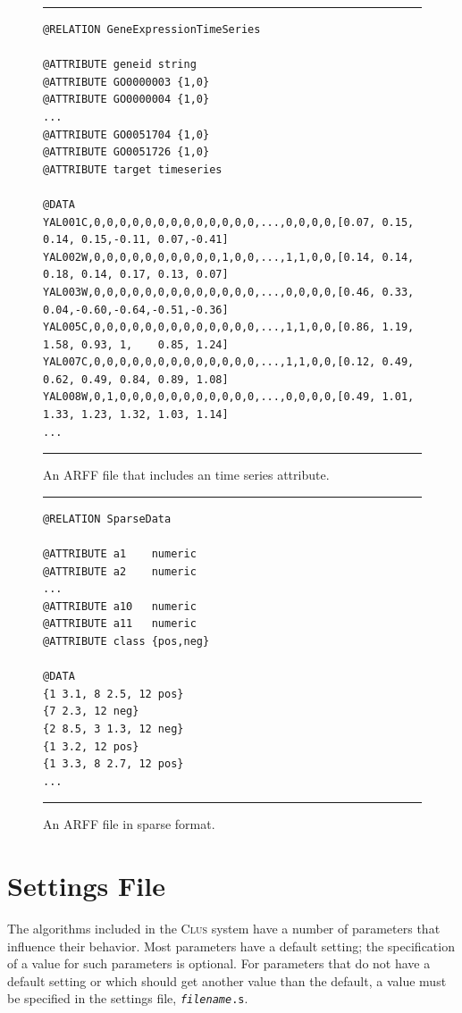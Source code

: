 \documentclass[a4paper]{report}
\newcommand{\clus}{\textsc{Clus}}
\begin{document}
\begin{figure}[tb]
\hrule\vspace{1em}
\begin{verbatim}
@RELATION GeneExpressionTimeSeries

@ATTRIBUTE geneid string
@ATTRIBUTE GO0000003 {1,0}
@ATTRIBUTE GO0000004 {1,0}
...
@ATTRIBUTE GO0051704 {1,0}
@ATTRIBUTE GO0051726 {1,0}
@ATTRIBUTE target timeseries

@DATA
YAL001C,0,0,0,0,0,0,0,0,0,0,0,0,0,...,0,0,0,0,[0.07, 0.15, 0.14, 0.15,-0.11, 0.07,-0.41]
YAL002W,0,0,0,0,0,0,0,0,0,0,1,0,0,...,1,1,0,0,[0.14, 0.14, 0.18, 0.14, 0.17, 0.13, 0.07]
YAL003W,0,0,0,0,0,0,0,0,0,0,0,0,0,...,0,0,0,0,[0.46, 0.33, 0.04,-0.60,-0.64,-0.51,-0.36]
YAL005C,0,0,0,0,0,0,0,0,0,0,0,0,0,...,1,1,0,0,[0.86, 1.19, 1.58, 0.93, 1,    0.85, 1.24]
YAL007C,0,0,0,0,0,0,0,0,0,0,0,0,0,...,1,1,0,0,[0.12, 0.49, 0.62, 0.49, 0.84, 0.89, 1.08]
YAL008W,0,1,0,0,0,0,0,0,0,0,0,0,0,...,0,0,0,0,[0.49, 1.01, 1.33, 1.23, 1.32, 1.03, 1.14]
...
\end{verbatim}
\hrule
\caption{An ARFF file that includes an time series attribute.}
\label{arfftimeser:fig}
\end{figure}

\begin{figure}[tb]
\hrule\vspace{1em}
\begin{verbatim}
@RELATION SparseData

@ATTRIBUTE a1    numeric
@ATTRIBUTE a2    numeric
...
@ATTRIBUTE a10   numeric
@ATTRIBUTE a11   numeric
@ATTRIBUTE class {pos,neg}

@DATA
{1 3.1, 8 2.5, 12 pos}
{7 2.3, 12 neg}
{2 8.5, 3 1.3, 12 neg}
{1 3.2, 12 pos}
{1 3.3, 8 2.7, 12 pos}
...
\end{verbatim}
\hrule
\caption{An ARFF file in sparse format.}
\label{arffsparse:fig}
\end{figure}

%
\chapter{Settings File}
\label{ch:sett}

The algorithms included in the \clus{} system have a number of parameters that influence their behavior.  Most parameters have a default setting; the specification of a value for such parameters is optional.  For parameters that do not have a default setting or which should get another value than the default, a value must be specified in the settings file, {\tt {\em filename}.s}.
\end{document}
